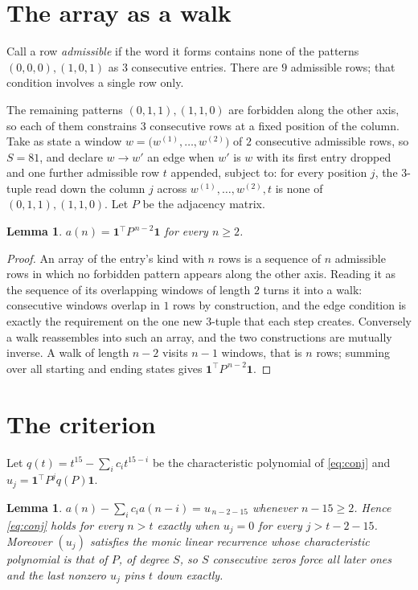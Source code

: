 \documentclass[11pt,a4paper]{article}
\theoremstyle{plain}
\newtheorem{lemma}[theorem]{Lemma}
\theoremstyle{definition}
\begin{document}
\section{The array as a walk}

Call a row \emph{admissible} if the word it forms contains none of the patterns
$(0,0,0), (1,0,1)$ as $3$ consecutive entries. There are $9$ admissible rows; that condition
involves a single row only.

The remaining patterns $(0,1,1), (1,1,0)$ are forbidden along the other axis, so each of them
constrains $3$ consecutive rows at a fixed position of the column. Take as state a
window $w=\bigl(w^{(1)},\dots,w^{(2)}\bigr)$ of $2$ consecutive admissible
rows, so $S=81$, and declare $w\to w'$ an edge when $w'$ is $w$ with its first entry
dropped and one further admissible row $t$ appended, subject to: for every position
$j$, the $3$-tuple read down the column $j$ across $w^{(1)},\dots,w^{(2)},t$
is none of $(0,1,1), (1,1,0)$. Let $P$ be the adjacency matrix.

\begin{lemma}\label{lem:walk}
$a(n)=\mathbf{1}^{\!\top}P^{\,n-2}\mathbf{1}$ for every $n\ge2$.
\end{lemma}

\begin{proof}
An array of the entry's kind with $n$ rows is a sequence of $n$ admissible rows in
which no forbidden pattern appears along the other axis. Reading it as the sequence of its
overlapping windows of length $2$ turns it into a walk: consecutive windows overlap in
$1$ rows by construction, and the edge condition is exactly the requirement on the one
new $3$-tuple that each step creates. Conversely a walk reassembles into such an array,
and the two constructions are mutually inverse. A walk of length $n-2$ visits $n-1$
windows, that is $n$ rows; summing over all starting and ending states gives
$\mathbf{1}^{\!\top}P^{\,n-2}\mathbf{1}$.
\end{proof}

\section{The criterion}

Let $q(t)=t^{15}-\sum_i c_i t^{15-i}$ be the characteristic polynomial of
\eqref{eq:conj} and $u_j=\mathbf{1}^{\!\top}P^{j}q(P)\mathbf{1}$.

\begin{lemma}\label{lem:crit}
$a(n)-\sum_i c_i a(n-i)=u_{\,n-2-15}$ whenever $n-15\ge2$. Hence
\eqref{eq:conj} holds for every $n>t$ exactly when $u_j=0$ for every
$j>t-2-15$. Moreover $(u_j)$ satisfies the monic linear recurrence whose
characteristic polynomial is that of $P$, of degree $S$, so $S$ consecutive zeros force all
later ones and the last nonzero $u_j$ pins $t$ down exactly.
\end{lemma}
\end{document}
